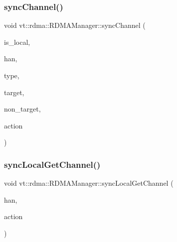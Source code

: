 \subsubsection{\texorpdfstring{sync\+Channel()}{syncChannel()}}
{\footnotesize\ttfamily void vt\+::rdma\+::\+R\+D\+M\+A\+Manager\+::sync\+Channel (\begin{DoxyParamCaption}\item[{bool const \&}]{is\+\_\+local,  }\item[{\hyperlink{namespacevt_a10442579ec4e7ebef223818e64bcf908}{R\+D\+M\+A\+\_\+\+Handle\+Type} const \&}]{han,  }\item[{\hyperlink{namespacevt_1_1rdma_ac848e1d9da43db6294bd06f83e5d3946}{R\+D\+M\+A\+\_\+\+Type\+Type} const \&}]{type,  }\item[{\hyperlink{namespacevt_a866da9d0efc19c0a1ce79e9e492f47e2}{Node\+Type} const \&}]{target,  }\item[{\hyperlink{namespacevt_a866da9d0efc19c0a1ce79e9e492f47e2}{Node\+Type} const \&}]{non\+\_\+target,  }\item[{\hyperlink{namespacevt_ae0a5a7b18cc99d7b732cb4d44f46b0f3}{Action\+Type} const \&}]{action }\end{DoxyParamCaption})\hspace{0.3cm}{\ttfamily [private]}}

\mbox{\label{structvt_1_1rdma_1_1_r_d_m_a_manager_a85e3bd458484375b762492ed0d65d9f5}} 
\subsubsection{\texorpdfstring{sync\+Local\+Get\+Channel()}{syncLocalGetChannel()}\hspace{0.1cm}{\footnotesize\ttfamily [1/2]}}
{\footnotesize\ttfamily void vt\+::rdma\+::\+R\+D\+M\+A\+Manager\+::sync\+Local\+Get\+Channel (\begin{DoxyParamCaption}\item[{\hyperlink{namespacevt_a10442579ec4e7ebef223818e64bcf908}{R\+D\+M\+A\+\_\+\+Handle\+Type} const \&}]{han,  }\item[{\hyperlink{namespacevt_ae0a5a7b18cc99d7b732cb4d44f46b0f3}{Action\+Type} const \&}]{action }\end{DoxyParamCaption})\hspace{0.3cm}{\ttfamily [inline]}}



